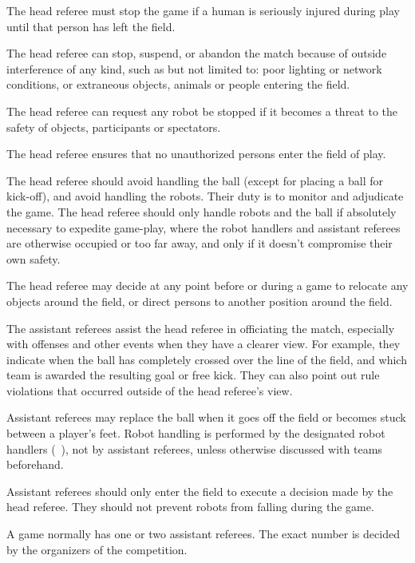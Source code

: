 The head referee must stop the game if a human is seriously injured during play until that person has left the field.

The head referee can stop, suspend, or abandon the match because of outside interference of any kind, such as but not limited to: poor lighting or network conditions, or extraneous objects, animals or people entering the field.

The head referee can request any robot be stopped if it becomes a threat to the safety of objects, participants or spectators.

The head referee ensures that no unauthorized persons enter the field of play.

The head referee should avoid handling the ball (except for placing a ball for kick-off), and avoid handling the robots. Their duty is to monitor and adjudicate the game. The head referee should only handle robots and the ball if absolutely necessary to expedite game-play, where the robot handlers and assistant referees are otherwise occupied or too far away, and only if it doesn't compromise their own safety.

The head referee may decide at any point before or during a game to relocate any objects around the field, or direct persons to another position around the field.



\label{sec:assistant_referee}

The assistant referees assist the head referee in officiating the match, especially with offenses and other events when they have a clearer view. For example, they indicate when the ball has completely crossed over the line of the field, and which team is awarded the resulting goal or free kick. They can also point out rule violations that occurred outside of the head referee's view.

Assistant referees may replace the ball when it goes off the field or becomes stuck between a player's feet. Robot handling is performed by the designated robot handlers (\cf~), not by assistant referees, unless otherwise discussed with teams beforehand.

Assistant referees should only enter the field to execute a decision made by the head referee. They should not prevent robots from falling during the game.

A game normally has one or two assistant referees. The exact number is decided by the organizers of the competition.

